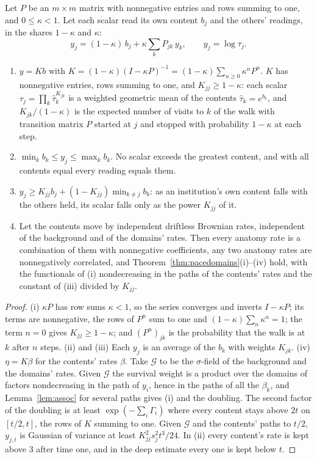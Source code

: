 \begin{proposition}[Listening; {[P]}]\label{prop:listening}
Let $P$ be an $m\times m$ matrix with nonnegative entries and rows
summing to one, and $0\le\kappa<1$. Let each scalar read its own content
$b_j$ and the others' readings, in the shares $1-\kappa$ and $\kappa$:
\begin{equation}\label{eq:listening}
y_j=(1-\kappa)\,b_j+\kappa\sum_kP_{jk}\,y_k,\qquad y_j=\log\tau_j.
\end{equation}
\begin{enumerate}[label=\emph{(\roman*)},itemsep=1pt]
\item $y=Kb$ with
$K=(1-\kappa)(I-\kappa P)^{-1}=(1-\kappa)\sum_{n\ge0}\kappa^nP^n$. $K$ has
nonnegative entries, rows summing to one, and $K_{jj}\ge1-\kappa$: each
scalar $\tau_j=\prod_k\hat\tau_k^{K_{jk}}$ is a weighted geometric mean of
the contents $\hat\tau_k=e^{b_k}$, and $K_{jk}/(1-\kappa)$ is the expected
number of visits to $k$ of the walk with transition matrix $P$ started at
$j$ and stopped with probability $1-\kappa$ at each step.
\item $\min_kb_k\le y_j\le\max_kb_k$. No scalar exceeds the greatest
content, and with all contents equal every reading equals them.
\item $y_j\ge K_{jj}b_j+(1-K_{jj})\min_{k\neq j}b_k$: as an institution's
own content falls with the others held, its scalar falls only as the
power $K_{jj}$ of it.
\item Let the contents move by independent driftless Brownian rates,
independent of the background and of the domains' rates. Then every
anatomy rate is a combination of them with nonnegative coefficients, any
two anatomy rates are nonnegatively correlated, and
Theorem~\ref{thm:pacedomains}(i)--(iv) hold, with the functionals of (i)
nondecreasing in the paths of the contents' rates and the constant of
(iii) divided by $K_{jj}$.
\end{enumerate}
\end{proposition}

\begin{proof}
(i) $\kappa P$ has row sums $\kappa<1$, so the series converges and inverts
$I-\kappa P$; its terms are nonnegative, the rows of $P^n$ sum to one and
$(1-\kappa)\sum_n\kappa^n=1$; the term $n=0$ gives $K_{jj}\ge1-\kappa$; and
$(P^n)_{jk}$ is the probability that the walk is at $k$ after $n$ steps.
(ii) and (iii) Each $y_j$ is an average of the $b_k$ with weights
$K_{jk}$. (iv) $\eta=K\beta$ for the contents' rates $\beta$. Take
$\mathcal G$ to be the $\sigma$-field of the background and the domains'
rates. Given $\mathcal G$ the survival weight is a product over the
domains of factors nondecreasing in the path of $y_i$, hence in the paths
of all the $\beta_k$, and Lemma~\ref{lem:assoc} for several paths gives
(i) and the doubling. The second factor of the doubling is at least
$\exp(-\sum_i\Gamma_i)$ where every content stays above $2t$ on
$[t/2,t]$, the rows of $K$ summing to one. Given $\mathcal G$ and the
contents' paths to $t/2$, $y_{j,t}$ is Gaussian of variance at least
$K_{jj}^2s_j^2t^3/24$. In (ii) every content's rate is kept above $3$
after time one, and in the deep estimate every one is kept below $t$.
\end{proof}

